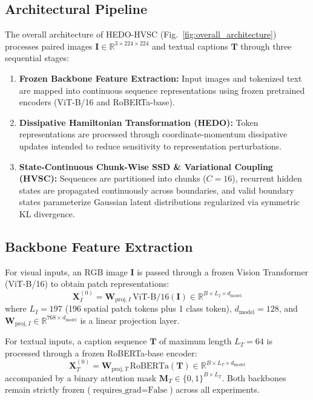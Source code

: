 \documentclass[pdflatex,sn-mathphys-num]{sn-jnl}%
\begin{document}
\subsection{Architectural Pipeline}
The overall architecture of HEDO-HVSC (Fig.~\ref{fig:overall_architecture}) processes paired images $\mathbf{I} \in \mathbb{R}^{3 \times 224 \times 224}$ and textual captions $\mathbf{T}$ through three sequential stages:
\begin{enumerate}
    \item \textbf{Frozen Backbone Feature Extraction:} Input images and tokenized text are mapped into continuous sequence representations using frozen pretrained encoders (ViT-B/16 and RoBERTa-base).
    \item \textbf{Dissipative Hamiltonian Transformation (HEDO):} Token representations are processed through coordinate-momentum dissipative updates intended to reduce sensitivity to representation perturbations.
    \item \textbf{State-Continuous Chunk-Wise SSD \& Variational Coupling (HVSC):} Sequences are partitioned into chunks ($C=16$), recurrent hidden states are propagated continuously across boundaries, and valid boundary states parameterize Gaussian latent distributions regularized via symmetric KL divergence.
\end{enumerate}

\subsection{Backbone Feature Extraction}
For visual inputs, an RGB image $\mathbf{I}$ is passed through a frozen Vision Transformer (ViT-B/16) to obtain patch representations:
\begin{equation}
\mathbf{X}_I^{(0)} = \mathbf{W}_{\text{proj}, I} \, \text{ViT-B/16}(\mathbf{I}) \in \mathbb{R}^{B \times L_I \times d_{\text{model}}} \label{eq:vit}
\end{equation}
where $L_I = 197$ (196 spatial patch tokens plus 1 class token), $d_{\text{model}} = 128$, and $\mathbf{W}_{\text{proj}, I} \in \mathbb{R}^{768 \times d_{\text{model}}}$ is a linear projection layer.

For textual inputs, a caption sequence $\mathbf{T}$ of maximum length $L_T = 64$ is processed through a frozen RoBERTa-base encoder:
\begin{equation}
\mathbf{X}_T^{(0)} = \mathbf{W}_{\text{proj}, T} \, \text{RoBERTa}(\mathbf{T}) \in \mathbb{R}^{B \times L_T \times d_{\text{model}}} \label{eq:roberta}
\end{equation}
accompanied by a binary attention mask $\mathbf{M}_T \in \{0, 1\}^{B \times L_T}$. Both backbones remain strictly frozen ($\text{requires\_grad} = \text{False}$) across all experiments.
\end{document}
